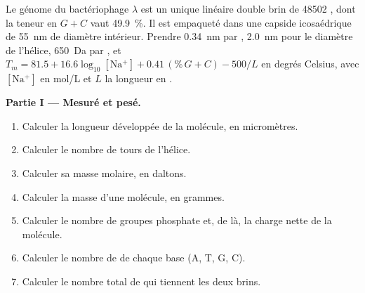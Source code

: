 \begin{problem}
\label{pb:b1:nucleic-acids:1}
Le génome du bactériophage $\lambda$ est un unique  linéaire double
brin de \num{48502} , dont la teneur en $G + C$ vaut
\qty{49.9}{\%}. Il est empaqueté dans une capside icosaédrique de
\qty{55}{nm} de diamètre intérieur. Prendre \qty{0.34}{nm} par , \qty{2.0}{nm} pour le diamètre de l'hélice, \qty{650}{Da} par
, et $T_m = 81.5 + 16.6\log_{10}[\mathrm{Na^+}]
+ 0.41\,(\%\,G{+}C) - 500/L$ en degrés Celsius, avec $[\mathrm{Na^+}]$
en \unit{mol/L} et $L$ la longueur en .

\medskip
\noindent\textbf{Partie I --- Mesuré et pesé.}
\begin{enumerate}
  \item Calculer la longueur développée de la molécule, en micromètres.
  \item Calculer le nombre de tours de l'hélice.
  \item Calculer sa masse molaire, en daltons.
  \item Calculer la masse d'une molécule, en grammes.
  \item Calculer le nombre de groupes phosphate et, de là, la charge
        nette de la molécule.
  \item Calculer le nombre de  de chaque base (A, T, G, C).
  \item Calculer le nombre total de  qui tiennent les
        deux brins.
\end{enumerate}


\end{problem}
